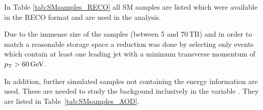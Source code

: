 In Table \ref{tab:SMsamples_RECO} all SM samples are listed which were available in the RECO format and are used in the analysis.
\renewcommand{\arraystretch}{1.5}
\begin{table}[!b]
\centering
\caption{Available Standard Model background samples containing $\Delta E/\Delta x$ information which are used for background estimation studies.}
\label{tab:SMsamples_RECO}
\end{table}  
Due to the immense size of the samples (between 5 and 70\,TB) and in order to match a reasonable storage space a reduction was done by selecting only events which contain at least one leading jet with a minimum transverse momentum of $p_{\text{T}}>60\,\text{Ge}\kern-0.06667em\text{V}$.

In addition, further simulated samples not containing the energy information are used.
These are needed to study the backgound inclusively in the variable \ias.
They are listed in Table~\ref{tab:SMsamples_AOD}.
\renewcommand{\arraystretch}{1.5}
\begin{table}[!t]
\centering
\caption{Standard Model background samples without $\Delta E/\Delta x$ information.}
\label{tab:SMsamples_AOD}
\end{table}  

